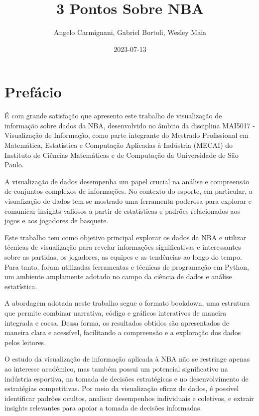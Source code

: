 \documentclass[
]{book}
\title{3 Pontos Sobre NBA}
\author{Angelo Carmignani, Gabriel Bortoli, Wesley Maia}
\date{2023-07-13}
\begin{document}
\maketitle

{
\setcounter{tocdepth}{1}
\tableofcontents
}
\hypertarget{prefuxe1cio}{%
\chapter*{Prefácio}\label{prefuxe1cio}}

É com grande satisfação que apresento este trabalho de visualização de informação sobre dados da NBA, desenvolvido no âmbito da disciplina MAI5017 - Visualização de Informação, como parte integrante do Mestrado Profissional em Matemática, Estatística e Computação Aplicadas à Indústria (MECAI) do Instituto de Ciências Matemáticas e de Computação da Universidade de São Paulo.

A visualização de dados desempenha um papel crucial na análise e compreensão de conjuntos complexos de informações. No contexto do esporte, em particular, a visualização de dados tem se mostrado uma ferramenta poderosa para explorar e comunicar insights valiosos a partir de estatísticas e padrões relacionados aos jogos e aos jogadores de basquete.

Este trabalho tem como objetivo principal explorar os dados da NBA e utilizar técnicas de visualização para revelar informações significativas e interessantes sobre as partidas, os jogadores, as equipes e as tendências ao longo do tempo. Para tanto, foram utilizadas ferramentas e técnicas de programação em Python, um ambiente amplamente adotado no campo da ciência de dados e análise estatística.

A abordagem adotada neste trabalho segue o formato bookdown, uma estrutura que permite combinar narrativa, código e gráficos interativos de maneira integrada e coesa. Dessa forma, os resultados obtidos são apresentados de maneira clara e acessível, facilitando a compreensão e a exploração dos dados pelos leitores.

O estudo da visualização de informação aplicada à NBA não se restringe apenas ao interesse acadêmico, mas também possui um potencial significativo na indústria esportiva, na tomada de decisões estratégicas e no desenvolvimento de estratégias competitivas. Por meio da visualização eficaz de dados, é possível identificar padrões ocultos, analisar desempenhos individuais e coletivos, e extrair insights relevantes para apoiar a tomada de decisões informadas.
\end{document}
